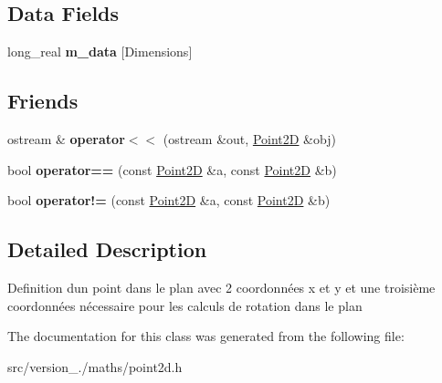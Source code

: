 \subsection*{Data Fields}
\begin{DoxyCompactItemize}
\item 
\mbox{\label{classez_1_1maths_1_1Point2D_a9d7f5f03ebca42ce1bd6d8f336b66250}} 
long\+\_\+real {\bfseries m\+\_\+data} \mbox{[}Dimensions\mbox{]}
\end{DoxyCompactItemize}
\subsection*{Friends}
\begin{DoxyCompactItemize}
\item 
\mbox{\label{classez_1_1maths_1_1Point2D_a0f690bb32687e0b3cd978c8fcb3afbef}} 
ostream \& {\bfseries operator$<$$<$} (ostream \&out, \hyperlink{classez_1_1maths_1_1Point2D}{Point2D} \&obj)
\item 
\mbox{\label{classez_1_1maths_1_1Point2D_ad24536b6a8a61bbe22d7a2a7e57941cc}} 
bool {\bfseries operator==} (const \hyperlink{classez_1_1maths_1_1Point2D}{Point2D} \&a, const \hyperlink{classez_1_1maths_1_1Point2D}{Point2D} \&b)
\item 
\mbox{\label{classez_1_1maths_1_1Point2D_a39289c13f80d3db07cb177c833e22488}} 
bool {\bfseries operator!=} (const \hyperlink{classez_1_1maths_1_1Point2D}{Point2D} \&a, const \hyperlink{classez_1_1maths_1_1Point2D}{Point2D} \&b)
\end{DoxyCompactItemize}


\subsection{Detailed Description}
Definition d\textquotesingle{}un point dans le plan avec 2 coordonnées x et y et une troisième coordonnées nécessaire pour les calculs de rotation dans le plan 

The documentation for this class was generated from the following file\+:\begin{DoxyCompactItemize}
\item 
src/version\+\_./maths/point2d.\+h\end{DoxyCompactItemize}
